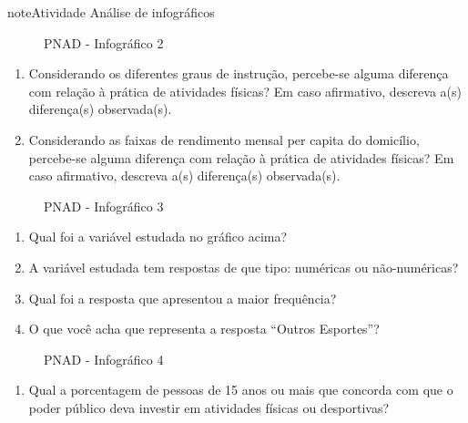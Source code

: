 \begin{sphinxadmonition}{note}{Atividade}{ Análise de infográficos}
\begin{enumerate}
\end{enumerate}

\begin{figure}[H]
\centering
\capstart

\noindent{}
\caption{PNAD - Infográfico 2}\label{\detokenize{PE103-0:fig-infografico-pnad-2}}\label{\detokenize{PE103-0:id2}}\end{figure}
\begin{enumerate}
\item {} 
Considerando os diferentes graus de instrução, percebe-se alguma diferença com relação à prática de atividades físicas? Em caso afirmativo, descreva a(s) diferença(s) observada(s).

\item {} 
Considerando as faixas de rendimento mensal per capita do domicílio, percebe-se alguma diferença com relação à prática de atividades físicas? Em caso afirmativo, descreva a(s) diferença(s) observada(s).

\end{enumerate}

\begin{figure}[H]
\centering
\capstart

\noindent{}
\caption{PNAD - Infográfico 3}\label{\detokenize{PE103-0:fig-infografico-pnad-3}}\label{\detokenize{PE103-0:id3}}\end{figure}
\begin{enumerate}
\item {} 
Qual foi a variável estudada no gráfico acima?

\item {} 
A variável estudada tem respostas de que tipo: numéricas ou não-numéricas?

\item {} 
Qual foi a resposta que apresentou a maior frequência?

\item {} 
O que você acha que representa a resposta ``Outros Esportes''?

\end{enumerate}

\begin{figure}[H]
\centering
\capstart

\noindent{}
\caption{PNAD - Infográfico 4}\label{\detokenize{PE103-0:fig-infografico-pnad-4}}\label{\detokenize{PE103-0:id4}}\end{figure}
\begin{enumerate}
\item {} 
Qual a porcentagem de pessoas de 15 anos ou mais que concorda com que o poder público deva investir em atividades físicas ou desportivas?


\end{enumerate}
\end{sphinxadmonition}
